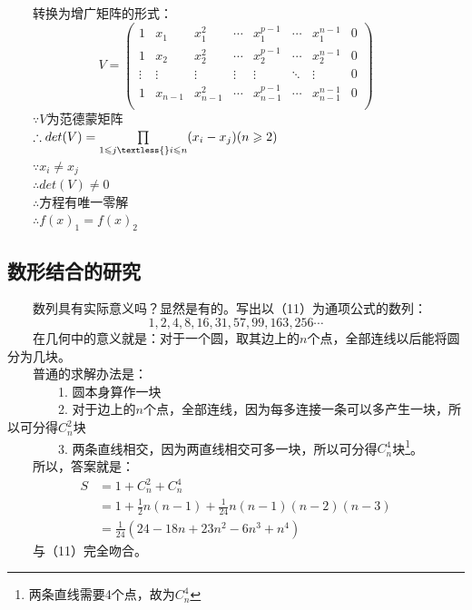 \documentclass[12pt]{article}
\begin{document}
        　　转换为增广矩阵的形式：
        \begin{equation}
          V=\left (
            \begin{array}{ccccccc|c}
              1 & x_{1} & x_{1}^{2} & \cdots & x_{1}^{p-1} & \cdots & x_{1}^{n-1} & 0 \\
              1 & x_{2} & x_{2}^{2} & \cdots & x_{2}^{p-1} & \cdots & x_{2}^{n-1} & 0 \\
              \vdots & \vdots & \vdots & \vdots & \vdots & \ddots & \vdots & 0 \\
              1 & x_{n-1} & x_{n-1}^{2}  & \cdots & x_{n-1}^{p-1}  & \cdots & x_{n-1}^{n-1} & 0\\
            \end{array}
          \right)
        \end{equation}
        　　$\because V$为范德蒙矩阵\\
        　　$\therefore det(V)=\prod\limits_{1\leqslant{}j\textless{}i\leqslant{}n}(x_{i}-x_{j}) (n\geqslant{}2)$\\
        　　$\because x_{i}\neq{}x_{j}$\\
        　　$\therefore det(V)\neq0$\\
        　　$\therefore$方程有唯一零解\\
        　　$\therefore f(x)_{1}=f(x)_{2}$
      \subsection{数形结合的研究}
        　　数列具有实际意义吗？显然是有的。写出以（11）为通项公式的数列：
        \begin{equation}
          1, 2, 4, 8, 16, 31, 57, 99, 163, 256\cdots
        \end{equation}
        　　在几何中的意义就是：对于一个圆，取其边上的$n$个点，全部连线以后能将圆分为几块。\\
        　　普通的求解办法是：\\
        　　　　1. 圆本身算作一块\\
        　　　　2. 对于边上的$n$个点，全部连线，因为每多连接一条可以多产生一块，所以可分得$C^{2}_{n}$块\\
        　　　　3. 两条直线相交，因为两直线相交可多一块，所以可分得$C^{4}_{n}$块\footnote{两条直线需要4个点，故为$C^{4}_{n}$}。\\
        　　所以，答案就是：
        \begin{equation}
          \begin{aligned}
            S&=1+C^{2}_{n}+C^{4}_{n}\\
            &=1+\frac{1}{2}n(n-1)+\frac{1}{24}n(n-1)(n-2)(n-3)\\
            &=\frac{1}{24}(24-18n+23n^{2}-6n^{3}+n^{4})
          \end{aligned}
        \end{equation}
        　　与（11）完全吻合。
\end{document}
